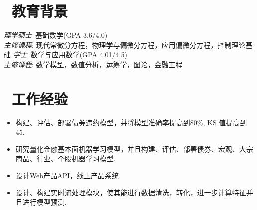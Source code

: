 \documentclass{resume}
\begin{document}


 
\section{\faGraduationCap\  教育背景}
\textit{理学硕士}\ 基础数学(GPA 3.6/4.0)\\
\textit{主修课程}:
现代常微分方程，物理学与偏微分方程，应用偏微分方程，控制理论基础
\textit{学士}\ 数学与应用数学(GPA 4.01/4.5)\\
\textit{主修课程}:
数学模型，数值分析，运筹学，图论，金融工程

\section{\faUsers\ 工作经验}
\role{数据科学家}{}
\begin{itemize}
  \item 构建、评估、部署债券违约模型，并将模型准确率提高到80\%, KS 值提高到45.
  \item 研究量化金融基本面机器学习模型，并且构建、评估、部署债券、宏观、大宗商品、行业、个股机器学习模型.
  \item 设计Web产品API，线上产品系统
  \item 设计、构建实时流处理模块，使其能进行数据清洗，转化，进一步计算特征并且进行模型预测.	  
\end{itemize}
\end{document}
